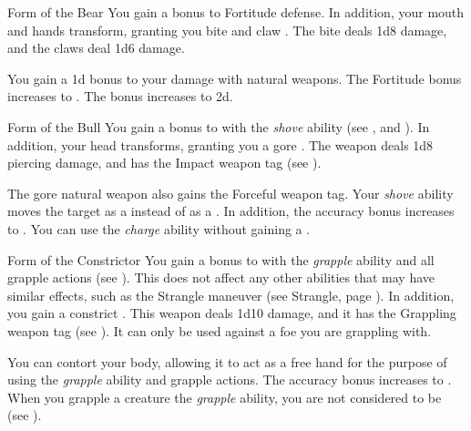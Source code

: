         {
            \begin{freeability}{Form of the Bear}
                You gain a  bonus to Fortitude defense.
                In addition, your mouth and hands transform, granting you bite and claw .
                The bite deals 1d8 damage, and the claws deal 1d6 damage.

                \rankline
                 You gain a \plus1d bonus to your damage with natural weapons.
                 The Fortitude bonus increases to .
                 The bonus increases to \plus2d.
            \end{freeability}

            \begin{freeability}{Form of the Bull}
                You gain a  bonus to  with the \textit{shove} ability (see , and ).
                In addition, your head transforms, granting you a gore .
                The weapon deals 1d8 piercing damage, and has the Impact weapon tag (see ).

                \rankline
                 The gore natural weapon also gains the Forceful weapon tag.
                 Your \textit{shove} ability moves the target as a  instead of as a .
                In addition, the accuracy bonus increases to .
                 You can use the \textit{charge} ability without gaining a .
            \end{freeability}

            \begin{freeability}{Form of the Constrictor}
                You gain a  bonus to  with the \textit{grapple} ability and all grapple actions (see ).
                This does not affect any other abilities that may have similar effects, such as the Strangle maneuver (see Strangle, page ).
                In addition, you gain a constrict .
                This weapon deals 1d10 damage, and it has the Grappling weapon tag (see ).
                It can only be used against a foe you are grappling with.

                \rankline
                 You can contort your body, allowing it to act as a free hand for the purpose of using the \textit{grapple} ability and grapple actions.
                 The accuracy bonus increases to .
                 When you grapple a creature the \textit{grapple} ability, you are not considered to be  (see ).
            \end{freeability}

}
